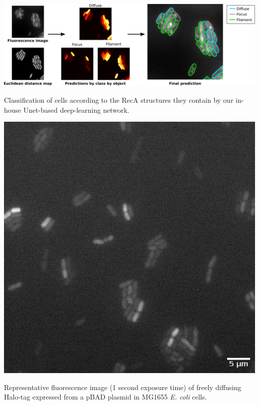 
\begin{suppfigure*}[htbp]
    \begin{center}
    \includegraphics[width=\textwidth]{SI_Figures/ObjectClassifier.pdf}
    \end{center}
    \caption{Classification of cells according to the RecA structures they contain by our in-house Unet-based deep-learning network.}
    \label{SIFig:object_class}
\end{suppfigure*}

\begin{suppfigure*}[htbp]
\begin{center}
\includegraphics[width=.5\linewidth]{SI_Figures/Free_Halo_image.png}
\end{center}
\caption{Representative fluorescence image (1 second exposure time) of freely diffusing Halo-tag expressed from a pBAD plasmid in MG1655 \textit{E. coli} cells.}
\label{SIFig:freehalo_image}
\end{suppfigure*}

